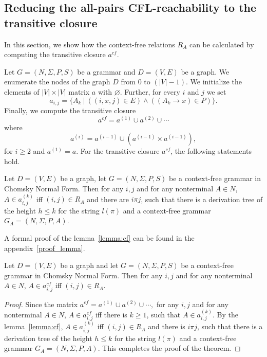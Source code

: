 \documentclass[runningheads,a4paper]{llncs}
\begin{document}
\subsection{Reducing the all-pairs CFL-reachability to the transitive closure} \label{section_reducing}
In this section, we show how the context-free relations $R_A$ can be calculated by computing the transitive closure $a^{cf}$.

Let $G = (N,\Sigma,P,S)$ be a grammar and $D = (V, E)$ be a graph. We enumerate the nodes of the graph $D$ from 0 to $(|V| - 1)$. We initialize the elements of $|V| \times |V|$ matrix $a$ with $\varnothing$. Further, for every $i$ and $j$ we set $$a_{i,j} = \{A_k~|~((i,x,j) \in E) \wedge ((A_k \rightarrow x) \in P)\}.$$ Finally, we compute the transitive closure $$a^{cf} = a^{(1)} \cup a^{(2)} \cup \cdots$$ where $$a^{(i)} = a^{(i-1)} \cup (a^{(i-1)} \times a^{(i-1)}),$$ for $i \ge 2$ and $a^{(1)} = a$. For the transitive closure $a^{cf}$, the following statements hold.

\begin{lemma}\label{lemma:cf}
	Let $D = (V,E)$ be a graph, let $G =(N,\Sigma,P,S)$ be a context-free grammar in Chomsky Normal Form. Then for any $i, j$ and for any nonterminal $A \in N$, $A \in a^{(k)}_{i,j}$ iff $(i,j) \in R_A$ and there are $i \pi j$, such that there is a derivation tree of the height $h \leq k$ for the string $l(\pi)$ and a context-free grammar $G_A = (N,\Sigma,P,A)$.
\end{lemma}

A formal proof of the lemma~\ref{lemma:cf} can be found in the appendix~\ref{proof_lemma}.

\begin{mytheorem}\label{thm:correct}
	Let $D = (V,E)$ be a graph and let $G =(N,\Sigma,P,S)$ be a context-free grammar in Chomsky Normal Form. Then for any $i, j$ and for any nonterminal $A \in N$, $A \in a^{cf}_{i,j}$ iff $(i,j) \in R_A$.
\end{mytheorem}
\begin{proof}
	
	Since the matrix $a^{cf} = a^{(1)} \cup a^{(2)} \cup \cdots,$ for any $i, j$ and for any nonterminal $A \in N$, $A \in a^{cf}_{i,j}$ iff there is $k \geq 1$, such that $A \in a^{(k)}_{i,j}$. By the lemma~\ref{lemma:cf}, $A \in a^{(k)}_{i,j}$ iff $(i,j) \in R_A$ and there is $i \pi j$, such that there is a derivation tree of the height $h \leq k$ for the string $l(\pi)$ and a context-free grammar $G_A = (N,\Sigma,P,A)$. This completes the proof of the theorem.
\end{proof}
\end{document}
